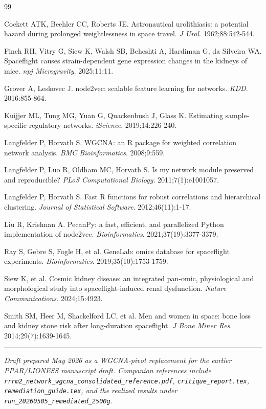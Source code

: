 \documentclass[11pt]{article}
\newcommand{\code}[1]{\texttt{#1}}
\newcommand{\runid}{\code{run\_20260505\_remediated\_2500g}}
\begin{document}
\begin{thebibliography}{99}\small

 Cockett ATK, Beehler CC, Roberts JE. Astronautical urolithiasis: a potential hazard during prolonged weightlessness in space travel. \emph{J Urol}. 1962;88:542-544.

 Finch RH, Vitry G, Siew K, Walsh SB, Beheshti A, Hardiman G, da Silveira WA. Spaceflight causes strain-dependent gene expression changes in the kidneys of mice. \emph{npj Microgravity}. 2025;11:11.

 Grover A, Leskovec J. node2vec: scalable feature learning for networks. \emph{KDD}. 2016:855-864.

 Kuijjer ML, Tung MG, Yuan G, Quackenbush J, Glass K. Estimating sample-specific regulatory networks. \emph{iScience}. 2019;14:226-240.

 Langfelder P, Horvath S. WGCNA: an R package for weighted correlation network analysis. \emph{BMC Bioinformatics}. 2008;9:559.

 Langfelder P, Luo R, Oldham MC, Horvath S. Is my network module preserved and reproducible? \emph{PLoS Computational Biology}. 2011;7(1):e1001057.

 Langfelder P, Horvath S. Fast R functions for robust correlations and hierarchical clustering. \emph{Journal of Statistical Software}. 2012;46(11):1-17.

 Liu R, Krishnan A. PecanPy: a fast, efficient, and parallelized Python implementation of node2vec. \emph{Bioinformatics}. 2021;37(19):3377-3379.

 Ray S, Gebre S, Fogle H, et al. GeneLab: omics database for spaceflight experiments. \emph{Bioinformatics}. 2019;35(10):1753-1759.

 Siew K, et al. Cosmic kidney disease: an integrated pan-omic, physiological and morphological study into spaceflight-induced renal dysfunction. \emph{Nature Communications}. 2024;15:4923.

 Smith SM, Heer M, Shackelford LC, et al. Men and women in space: bone loss and kidney stone risk after long-duration spaceflight. \emph{J Bone Miner Res}. 2014;29(7):1639-1645.

\end{thebibliography}

\vspace{1em}
\begin{center}
\rule{0.4\textwidth}{0.4pt}
\end{center}
\vspace{0.3em}
\noindent\textit{Draft prepared May 2026 as a WGCNA-pivot replacement for the earlier PPAR/LIONESS manuscript draft. Companion references include \code{rrrm2\_network\_wgcna\_consolidated\_reference.pdf}, \code{critique\_report.tex}, \code{remediation\_guide.tex}, and the realized results under \runid.}
\end{document}
